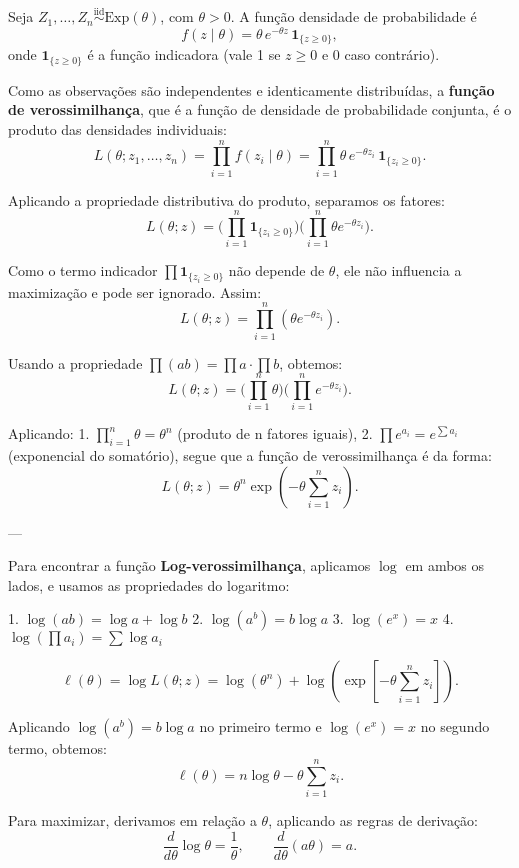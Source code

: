 Seja $Z_1,\ldots,Z_n \stackrel{\text{iid}}{\sim}\mathrm{Exp}(\theta)$, com $\theta>0$.
A função densidade de probabilidade é
\[
f(z\mid\theta)=\theta\,e^{-\theta z}\,\mathbf 1_{\{z\ge 0\}},
\]
onde $\mathbf 1_{\{z\ge 0\}}$ é a função indicadora (vale 1 se $z\ge 0$ e 0 caso contrário).

Como as observações são independentes e identicamente distribuídas,
a \textbf{função de verossimilhança}, que é a função de densidade de probabilidade conjunta, é o produto das densidades individuais:
\[
L(\theta;z_1,\ldots,z_n)
=\prod_{i=1}^n f(z_i\mid\theta)
=\prod_{i=1}^n \theta\,e^{-\theta z_i}\,\mathbf 1_{\{z_i\ge 0\}}.
\]

Aplicando a propriedade distributiva do produto, separamos os fatores:
\[
L(\theta;z)
=\Big(\prod_{i=1}^n \mathbf 1_{\{z_i\ge 0\}}\Big)
\Big(\prod_{i=1}^n \theta e^{-\theta z_i}\Big).
\]

Como o termo indicador $\prod \mathbf 1_{\{z_i\ge 0\}}$ não depende de $\theta$,
ele não influencia a maximização e pode ser ignorado. Assim:
\[
L(\theta;z)
=\prod_{i=1}^n (\theta e^{-\theta z_i}).
\]

Usando a propriedade $\prod(ab)=\prod a \cdot \prod b$, obtemos:
\[
L(\theta;z)
=\Big(\prod_{i=1}^n \theta\Big)
\Big(\prod_{i=1}^n e^{-\theta z_i}\Big).
\]

Aplicando:
1. $\prod_{i=1}^n \theta = \theta^n$ (produto de n fatores iguais),  
2. $\prod e^{a_i} = e^{\sum a_i}$ (exponencial do somatório),  segue que a função de verossimilhança é da forma:
\[
\boxed{
L(\theta;z)
=\theta^n \exp\!\left(-\theta \sum_{i=1}^n z_i\right).}
\]

---

Para encontrar a função \textbf{Log-verossimilhança}, aplicamos $\log$ em ambos os lados, e usamos as propriedades do logaritmo:

1. $\log(ab)=\log a+\log b$  
2. $\log(a^b)=b\log a$  
3. $\log(e^x)=x$  
4. $\log(\prod a_i)=\sum \log a_i$

\[
\ell(\theta)=\log L(\theta;z)
=\log(\theta^n)+\log\!\left(\exp\!\left[-\theta\sum_{i=1}^n z_i\right]\right).
\]

Aplicando $\log(a^b)=b\log a$ no primeiro termo
e $\log(e^x)=x$ no segundo termo, obtemos:
\[
\ell(\theta)=n\log\theta-\theta\sum_{i=1}^n z_i.
\]

Para maximizar, derivamos em relação a $\theta$, aplicando as regras de derivação:
\[
\frac{d}{d\theta}\log\theta=\frac{1}{\theta}, \qquad
\frac{d}{d\theta}(a\theta)=a.
\]

